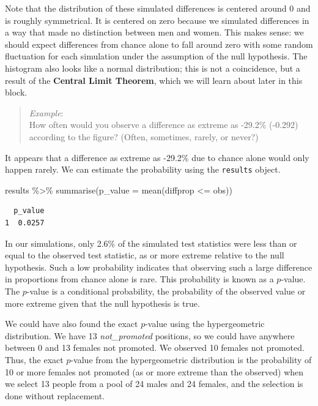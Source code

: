 \documentclass[
  letterpaper,
  DIV=11,
  numbers=noendperiod]{scrreprt}
\newenvironment{Shaded}{\begin{snugshade}}{\end{snugshade}}
\newcommand{\AttributeTok}[1]{\textcolor[rgb]{0.40,0.45,0.13}{#1}}
\newcommand{\FunctionTok}[1]{\textcolor[rgb]{0.28,0.35,0.67}{#1}}
\newcommand{\NormalTok}[1]{\textcolor[rgb]{0.00,0.23,0.31}{#1}}
\newcommand{\SpecialCharTok}[1]{\textcolor[rgb]{0.37,0.37,0.37}{#1}}
\begin{document}
Note that the distribution of these simulated differences is centered
around 0 and is roughly symmetrical. It is centered on zero because we
simulated differences in a way that made no distinction between men and
women. This makes sense: we should expect differences from chance alone
to fall around zero with some random fluctuation for each simulation
under the assumption of the null hypothesis. The histogram also looks
like a normal distribution; this is not a coincidence, but a result of
the \textbf{Central Limit Theorem}, which we will learn about later in
this block.

\begin{quote}
\emph{Example}:\\
How often would you observe a difference as extreme as -29.2\% (-0.292)
according to the figure? (Often, sometimes, rarely, or never?)
\end{quote}

It appears that a difference as extreme as -29.2\% due to chance alone
would only happen rarely. We can estimate the probability using the
\texttt{results} object.

\begin{Shaded}
\begin{Highlighting}[]
\NormalTok{results }\SpecialCharTok{\%\textgreater{}\%}
  \FunctionTok{summarise}\NormalTok{(}\AttributeTok{p\_value =} \FunctionTok{mean}\NormalTok{(diffprop }\SpecialCharTok{\textless{}=}\NormalTok{ obs))}
\end{Highlighting}
\end{Shaded}

\begin{verbatim}
  p_value
1  0.0257
\end{verbatim}

In our simulations, only 2.6\% of the simulated test statistics were
less than or equal to the observed test statistic, as or more extreme
relative to the null hypothesis. Such a low probability indicates that
observing such a large difference in proportions from chance alone is
rare. This probability is known as a \(p\)-value. The \(p\)-value is a
conditional probability, the probability of the observed value or more
extreme given that the null hypothesis is true.

We could have also found the exact \(p\)-value using the hypergeometric
distribution. We have 13 \emph{not\_promoted} positions, so we could
have anywhere between 0 and 13 females not promoted. We observed 10
females not promoted. Thus, the exact \(p\)-value from the
hypergeometric distribution is the probability of 10 or more females not
promoted (as or more extreme than the observed) when we select 13 people
from a pool of 24 males and 24 females, and the selection is done
without replacement.
\end{document}
